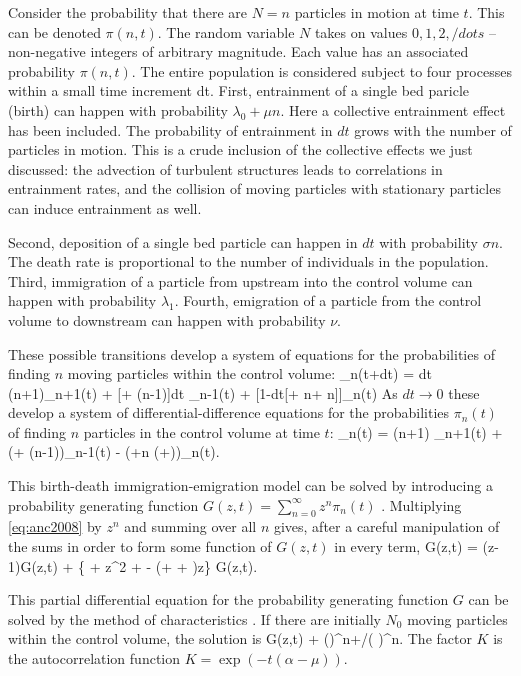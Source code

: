 Consider the probability that there are $N=n$ particles in motion at time $t$. 
This can be denoted $\pi(n,t)$. The random variable $N$ takes on values $0,1,2,/dots$ -- non-negative integers of arbitrary magnitude. Each value has an associated probability $\pi(n,t)$.  The entire population is considered subject to four processes within a small time increment dt. 
First, entrainment of a single bed paricle (birth) can happen with probability $\lambda_0 + \mu n$. 
Here a collective entrainment effect has been included. 
The probability of entrainment in $dt$ grows with the number of particles in motion. 
This is a crude inclusion of the collective effects we just discussed: the advection of turbulent structures leads to correlations in entrainment rates, and the collision of moving particles with stationary particles can induce entrainment as well. 

Second, deposition of a single bed particle can happen in $dt$ with probability $\sigma n$. 
The death rate is proportional to the number of individuals in the population. 
Third, immigration of a particle from upstream into the control volume can happen with probability $\lambda_1$. 
Fourth, emigration of a particle from the control volume to downstream can happen with probability $\nu$. 

These possible transitions develop a system of equations for the probabilities of finding $n$ moving particles within the control volume: 
\be \pi_n(t+dt) = \alpha dt (n+1)\pi_{n+1}(t) + [\lambda + (n-1)\mu]dt \pi_{n-1}(t) + [1-dt[\lambda + n\alpha + n\mu]]\pi_n(t) \ee
As $dt\rightarrow 0$ these develop a system of differential-difference equations for the probabilities $\pi_n(t)$ of finding $n$ particles in the control volume at time $t$: 
\be \dot{\pi}_n(t) = (n+1) \alpha \pi_{n+1}(t) + (\lambda + (n-1)\mu)\pi_{n-1}(t) - (\lambda +n (\alpha+\mu))\pi_n(t). \label{eq:anc2008} \ee 

This birth-death immigration-emigration model can be solved by introducing a probability generating function $G(z,t) = \sum_{n=0}^\infty z^n \pi_n(t)$ \citep{Gardiner1983, Ancey2008}. 
Multiplying \ref{eq:anc2008} by $z^n$ and summing over all $n$ gives, after a careful manipulation of the sums in order to form some function of $G(z,t)$ in every term, 
\be {} G(z,t) = \lambda(z-1)G(z,t) + \{ \sigma + \mu z^2 + \nu - (\mu + \sigma + \nu)z\}  G(z,t). \ee

This partial differential equation for the probability generating function $G$ can be solved by the method of characteristics \citep{}. 
If there are initially $N_0$ moving particles within the control volume, the solution is 
\be G(z,t) + \Big(\Big)^{n+\lambda/\mu}\Big( \Big)^n. \ee
The factor $K$ is the autocorrelation function $K = \exp(-t(\alpha-\mu)).$

